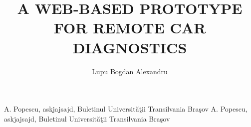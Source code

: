 \documentclass[11pt, oneside]{Thesis}
\title{A WEB-BASED PROTOTYPE FOR REMOTE CAR DIAGNOSTICS}
\author{Lupu Bogdan Alexandru}
\begin{document}
\maketitle




\tableofcontents
\listoffigures
\listoftables









\begin{thebibliography}{999}
A. Popescu, askjajsajd, Buletinul Universit\u a\c tii Transilvania Bra\c sov
A. Popescu, askjajsajd, Buletinul Universit\u a\c tii Transilvania Bra\c sov
\end{thebibliography}


 
\end{document}
